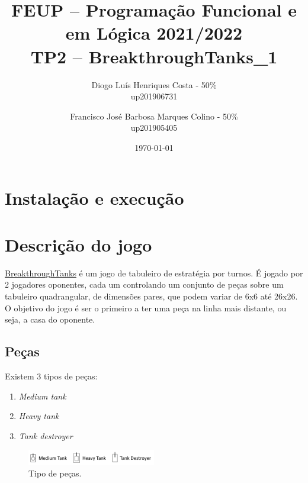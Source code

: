 \documentclass[a4paper,11pt,portuguese]{article}
\begin{document}

\author{
    Diogo Luís Henriques Costa - 50\% \\
    up201906731
    \and
    Francisco José Barbosa Marques Colino - 50\% \\
    up201905405
}
\title{FEUP -- Programação Funcional e em Lógica \large 2021/2022 \\ \large TP2 -- BreakthroughTanks\_1}
\date{\today}
\maketitle


\section{Instalação e execução}



\section{Descrição do jogo}

\href{https://boardgamegeek.com/boardgame/321224/breakthrough-tanks}{BreakthroughTanks}
é um jogo de tabuleiro de estratégia por turnos. É jogado por 2 jogadores oponentes, cada 
um controlando um conjunto de peças sobre um tabuleiro quadrangular, de dimensões pares, que podem variar
de 6x6 até 26x26. O objetivo do jogo é ser o primeiro a ter uma peça na linha mais distante, ou seja, a casa do oponente. 

\subsection{Peças}

\noindent Existem 3 tipos de peças:

\begin{enumerate}[topsep=4pt,itemsep=2pt]
    \item \textit{Medium tank}
    \item \textit{Heavy tank}
    \item \textit{Tank destroyer}
\end{enumerate}

\begin{figure}[H]
    \centering
    \includegraphics[width=0.5\textwidth]{imgs/pecas.png}
    \caption{Tipo de peças.}
    \label{fig:pecas}
\end{figure}
\end{document}
